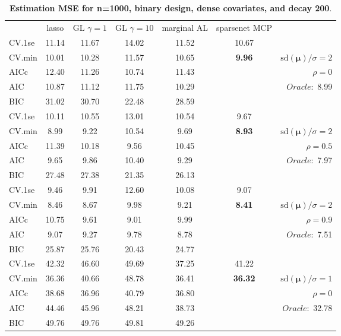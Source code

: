 \clearpage
\begin{table}\vspace{-.5cm}
\caption[l]{ { \bf Estimation MSE for n=1000, binary design, 
dense covariates, and  decay  200}.}
\vspace{-.5cm}
\footnotesize{}
\begin{center}
\begin{tabular}{l*{5}{c}|r}
& lasso & GL $\gamma=1$ & GL $\gamma=10$ & marginal AL & sparsenet MCP  & \\
 \cline{1-7}
CV.1se & 11.14 & 11.67 & 14.02 & 11.52 & 10.67 & \\
CV.min & 10.01 & 10.28 & 11.57 & 10.65 & {\bf 9.96} &  $\mathrm{sd}(\mathbf{\mu})/\sigma=2$ \\
AICc & 12.40 & 11.26 & 10.74 & 11.43 & & $\rho=0$ \\
AIC & 10.87 & 11.12 & 11.75 & 10.29 & &  \multirow{2}{*}{$Oracle: $ 8.99} \\
BIC & 31.02 & 30.70 & 22.48 & 28.59 & &  \\
 \hline 
CV.1se & 10.11 & 10.55 & 13.01 & 10.54 & 9.67 & \\
CV.min & 8.99 & 9.22 & 10.54 & 9.69 & {\bf 8.93} &  $\mathrm{sd}(\mathbf{\mu})/\sigma=2$ \\
AICc & 11.39 & 10.18 & 9.56 & 10.45 & & $\rho=0.5$ \\
AIC & 9.65 & 9.86 & 10.40 & 9.29 & &  \multirow{2}{*}{$Oracle: $ 7.97} \\
BIC & 27.48 & 27.38 & 21.35 & 26.13 & &  \\
 \hline 
CV.1se & 9.46 & 9.91 & 12.60 & 10.08 & 9.07 & \\
CV.min & 8.46 & 8.67 & 9.98 & 9.21 & {\bf 8.41} &  $\mathrm{sd}(\mathbf{\mu})/\sigma=2$ \\
AICc & 10.75 & 9.61 & 9.01 & 9.99 & & $\rho=0.9$ \\
AIC & 9.07 & 9.27 & 9.78 & 8.78 & &  \multirow{2}{*}{$Oracle: $ 7.51} \\
BIC & 25.87 & 25.76 & 20.43 & 24.77 & &  \\
 \hline 
CV.1se & 42.32 & 46.60 & 49.69 & 37.25 & 41.22 & \\
CV.min & 36.36 & 40.66 & 48.78 & 36.41 & {\bf 36.32} &  $\mathrm{sd}(\mathbf{\mu})/\sigma=1$ \\
AICc & 38.68 & 36.96 & 40.79 & 36.80 & & $\rho=0$ \\
AIC & 44.46 & 45.96 & 48.21 & 38.73 & &  \multirow{2}{*}{$Oracle: $ 32.78} \\
BIC & 49.76 & 49.76 & 49.81 & 49.26 & &  \\

\end{tabular}
\end{center}
\end{table}
